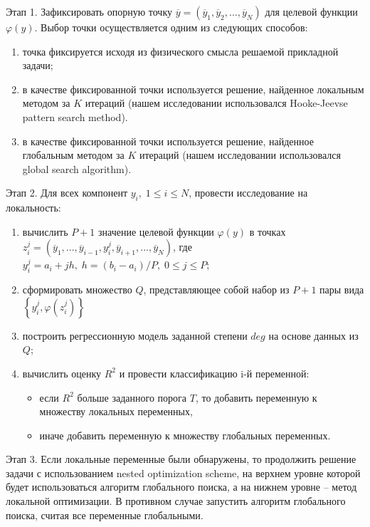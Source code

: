 \documentclass{aip-cp}
\begin{document}
Этап 1. Зафиксировать опорную точку $\overline{y} = (\overline{y}_1, \overline{y}_2,...,\overline{y}_N)$ для целевой функции $\varphi(y)$. Выбор точки осуществляется одним из следующих способов:
\begin{enumerate}
\item точка фиксируется исходя из физического смысла решаемой прикладной задачи;
\item в качестве фиксированной точки используется решение, найденное локальным методом за $K$ итераций (нашем исследовании использовался Hooke-Jeevse pattern search method).
\item в качестве фиксированной точки используется решение, найденное глобальным методом за $K$ итераций (нашем исследовании использовался global search algorithm).
\end{enumerate}

Этап 2. Для всех компонент $y_i, \; 1\leq i \leq N$, провести исследование на локальность:
\begin{enumerate}
\item вычислить $P+1$ значение целевой функции $\varphi(y)$ в точках $z_i^j = (\overline{y}_1,...,\overline{y}_{i-1},y_i^j,\overline{y}_{i+1},...,\overline{y}_N)$, где
$y_i^j =  a_i + jh, \; h=(b_i-a_i)/P, \; 0\leq j \leq P$;
\item сформировать множество $Q$, представляющее собой набор из $P+1$ пары вида $\left\{y_i^j, \varphi(z_i^j)\right\} $ 
\item построить регрессионную модель заданной степени $deg$ на основе данных из $Q$;
\item вычислить оценку $R^2$ и провести классификацию i-й переменной:
\begin{itemize}
\item если $R^2$ больше заданного порога $T$, то добавить переменную к множеству локальных переменных,
\item иначе добавить переменную к множеству глобальных переменных.
\end{itemize}
\end{enumerate}

Этап 3. Если локальные переменные были обнаружены, то продолжить решение задачи с использованием nested optimization scheme, на верхнем уровне которой будет использоваться алгоритм глобального поиска, а на нижнем уровне -- метод локальной оптимизации. В противном случае запустить алгоритм глобального поиска, считая все переменные глобальными.
\end{document}
